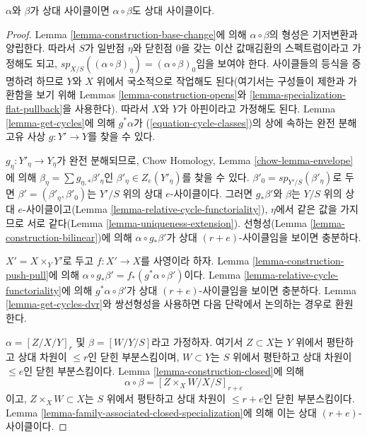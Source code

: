 \begin{lemma}
\label{lemma-well-defined}
$\alpha$와 $\beta$가 상대 사이클이면 $\alpha \circ \beta$도 상대
사이클이다.
\end{lemma}

\begin{proof}
Lemma \ref{lemma-construction-base-change}에 의해
$\alpha \circ \beta$의 형성은 기저변환과 양립한다. 따라서 $S$가
일반점 $\eta$와 닫힌점 $0$을 갖는 이산 값매김환의 스펙트럼이라고
가정해도 되고,
$sp_{X/S}((\alpha \circ \beta)_\eta) = (\alpha \circ \beta)_0$임을
보여야 한다. 사이클들의 등식을 증명하려 하므로 $Y$와 $X$ 위에서
국소적으로 작업해도 된다(여기서는 구성들이 제한과 가환함을 보기
위해 Lemmas \ref{lemma-construction-opens}와
\ref{lemma-specialization-flat-pullback}을 사용한다). 따라서 $X$와
$Y$가 아핀이라고 가정해도 된다. Lemma \ref{lemma-get-cycles}에 의해
$g^*\alpha$가 (\ref{equation-cycle-classes})의 상에 속하는 완전 분해
고유 사상 $g : Y' \to Y$를 찾을 수 있다.

\medskip\noindent
$g_\eta : Y'_\eta \to Y_\eta$가 완전 분해되므로, Chow Homology,
Lemma \ref{chow-lemma-envelope}에 의해
$\beta_\eta = \sum g_{\eta, *}\beta'_\eta$인
$\beta'_\eta \in Z_e(Y'_\eta)$를 찾을 수 있다.
$\beta'_0 = sp_{Y'/S}(\beta'_\eta)$로 두면
$\beta' = (\beta'_\eta, \beta'_0)$는 $Y'/S$ 위의 상대 $e$-사이클이다.
그러면 $g_*\beta'$와 $\beta$는 $Y/S$ 위의 상대 $e$-사이클이고(Lemma
\ref{lemma-relative-cycle-functoriality}), $\eta$에서 같은 값을 가지므로
서로 같다(Lemma \ref{lemma-uniqueness-extension}). 선형성(Lemma
\ref{lemma-construction-bilinear})에 의해 $\alpha \circ g_*\beta'$가
상대 $(r + e)$-사이클임을 보이면 충분하다.

\medskip\noindent
$X' = X \times_Y Y'$로 두고 $f : X' \to X$를 사영이라 하자. Lemma
\ref{lemma-construction-push-pull}에 의해
$\alpha \circ g_*\beta' = f_*(g^*\alpha \circ \beta')$이다. Lemma
\ref{lemma-relative-cycle-functoriality}에 의해
$g^*\alpha \circ \beta'$가 상대 $(r + e)$-사이클임을 보이면 충분하다.
Lemma \ref{lemma-get-cycles-dvr}와 쌍선형성을 사용하면 다음 단락에서
논의하는 경우로 환원한다.

\medskip\noindent
$\alpha = [Z/X/Y]_r$ 및 $\beta = [W/Y/S]$라고 가정하자. 여기서
$Z \subset X$는 $Y$ 위에서 평탄하고 상대 차원이 $\leq r$인 닫힌
부분스킴이며, $W \subset Y$는 $S$ 위에서 평탄하고 상대 차원이
$\leq e$인 닫힌 부분스킴이다. Lemma
\ref{lemma-construction-closed}에 의해
$$
\alpha \circ \beta = [Z \times_X W/X/S]_{r + e}
$$
이고, $Z \times_X W \subset X$는 $S$ 위에서 평탄하고 상대 차원이
$\leq r + e$인 닫힌 부분스킴이다. Lemma
\ref{lemma-family-associated-closed-specialization}에 의해 이는 상대
$(r + e)$-사이클이다.
\end{proof}

